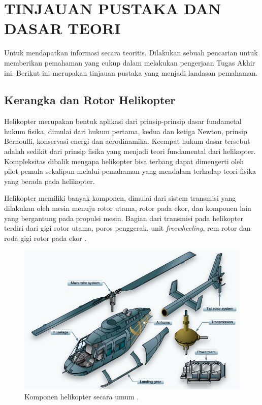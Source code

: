 \chapter{TINJAUAN PUSTAKA DAN DASAR TEORI}
\label{chap:tinjauanpustaka}


Untuk mendapatkan informasi secara teoritis. Dilakukan sebuah pencarian untuk memberikan pemahaman yang cukup dalam melakukan pengerjaan Tugas Akhir ini. Berikut ini merupakan tinjauan pustaka yang menjadi landasan pemahaman.

\section{Kerangka dan Rotor Helikopter}
\label{sec:strukturheli}

Helikopter merupakan bentuk aplikasi dari prinsip-prinsip dasar fundametal hukum fisika, dimulai dari hukum pertama, kedua dan ketiga Newton, prinsip Bernoulli, konservasi energi dan aerodinamika. Keempat hukum dasar tersebut adalah sedikit dari prinsip fisika yang menjadi teori fundamental dari helikopter. Kompleksitas dibalik mengapa helikopter bisa terbang dapat dimengerti oleh pilot pemula sekalipun melalui pemahaman yang mendalam terhadap teori fisika yang berada pada helikopter\cite{wagtendonk2006principles}.

Helikopter memiliki banyak komponen, dimulai dari sistem transmisi yang dilakukan oleh mesin menuju rotor utama, rotor pada ekor, dan komponen lain yang bergantung pada propulsi mesin. Bagian dari transmisi pada helikopter terdiri dari gigi rotor utama, poros penggerak, unit \textit{freewheeling}, rem rotor dan roda gigi rotor pada ekor  \cite{wagtendonk2006principles}.

\begin{figure}[H]
	\centering
	\includegraphics[width=0.8\linewidth]{gambar/komponenheli.png}
	\caption{Komponen helikopter secara umum \cite{handbook}.}
	\label{fig:komponenheli}
\end{figure}

